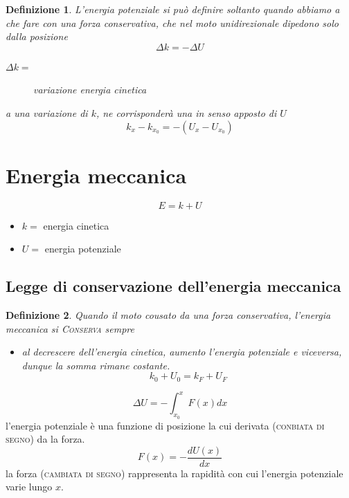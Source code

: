\documentclass{book}
\newtheorem{defi}{Definizione}[section]
\begin{document}
\begin{defi}
  L'energia potenziale si può definire soltanto quando abbiamo a che fare con una forza conservativa, che nel moto unidirezionale dipedono solo dalla posizione
  \begin{equation}
    \label{eq:enpot}
    \Delta k=-\Delta U
  \end{equation}
  \begin{description}
  \item[$\Delta k=$] variazione energia cinetica
  \end{description}
  a una variazione di $k$, ne corrisponderà una in senso apposto di $U$
  \begin{equation}
    \label{eq:differenzak}
    k_x-k_{x_0}=-(U_x-U_{x_0})
  \end{equation}
\end{defi}

\section{Energia meccanica}
\label{sec:enmecc}

\begin{equation}
  \label{eq:enmecc}
  E=k+U
\end{equation}
\begin{itemize}
\item $k=$ energia cinetica
\item $U=$ energia potenziale
\end{itemize}

\subsection{Legge di conservazione dell'energia meccanica}
\label{sec:leggconsenmec}

\begin{defi}
  Quando il moto cousato da una forza conservativa, l'energia meccanica si \textsc{Conserva} sempre
  \begin{itemize}
  \item al decrescere dell'energia cinetica, aumento l'energia potenziale e viceversa, {\color{red}dunque la somma rimane costante}.
    \begin{equation}
      \label{eq:leggconsenmec}
      k_0+U_0=k_F+U_F
    \end{equation}
  \end{itemize}
\end{defi}
\begin{multicols}{2}
  \begin{equation*}
    \Delta U=-\int_{x_0}^xF(x)dx
  \end{equation*}
  l'energia potenziale è una funzione di posizione la cui derivata (\textsc{conbiata di segno}) da la forza.\\
  \begin{equation*}
    F(x)=-\frac{dU(x)}{dx}
  \end{equation*}
  la forza (\textsc{cambiata di segno}) rappresenta la rapidità con cui l'energia potenziale varie lungo $x$.
\end{multicols}
\end{document}
